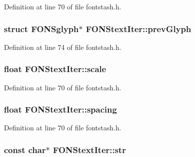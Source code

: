 Definition at line 70 of file fontstash.\+h.

\hypertarget{struct_f_o_n_stext_iter_a03a60d063cca83242aa67f5658705ce8}{
\subsubsection[{prev\+Glyph}]{\setlength{\rightskip}{0pt plus 5cm}struct F\+O\+N\+Sglyph$\ast$ F\+O\+N\+Stext\+Iter\+::prev\+Glyph}}\label{struct_f_o_n_stext_iter_a03a60d063cca83242aa67f5658705ce8}


Definition at line 74 of file fontstash.\+h.

\hypertarget{struct_f_o_n_stext_iter_a5738db7ad58f0e63b18ea45749a19b1a}{
\subsubsection[{scale}]{\setlength{\rightskip}{0pt plus 5cm}float F\+O\+N\+Stext\+Iter\+::scale}}\label{struct_f_o_n_stext_iter_a5738db7ad58f0e63b18ea45749a19b1a}


Definition at line 70 of file fontstash.\+h.

\hypertarget{struct_f_o_n_stext_iter_a9918e73c1fa648fe7381825f0a4e1580}{
\subsubsection[{spacing}]{\setlength{\rightskip}{0pt plus 5cm}float F\+O\+N\+Stext\+Iter\+::spacing}}\label{struct_f_o_n_stext_iter_a9918e73c1fa648fe7381825f0a4e1580}


Definition at line 70 of file fontstash.\+h.

\hypertarget{struct_f_o_n_stext_iter_afa9f4ba21030480d65c7fd4f1eab477c}{
\subsubsection[{str}]{\setlength{\rightskip}{0pt plus 5cm}const char$\ast$ F\+O\+N\+Stext\+Iter\+::str}}\label{struct_f_o_n_stext_iter_afa9f4ba21030480d65c7fd4f1eab477c}


